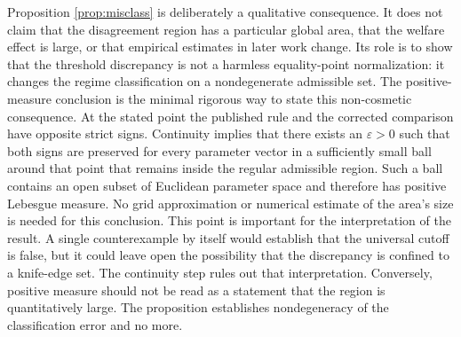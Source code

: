Proposition \ref{prop:misclass} is deliberately a qualitative consequence. It does not claim that the disagreement region has a particular global area, that the welfare effect is large, or that empirical estimates in later work change. Its role is to show that the threshold discrepancy is not a harmless equality-point normalization: it changes the regime classification on a nondegenerate admissible set. The positive-measure conclusion is the minimal rigorous way to state this non-cosmetic consequence. At the stated point the published rule and the corrected comparison have opposite strict signs. Continuity implies that there exists an $\varepsilon>0$ such that both signs are preserved for every parameter vector in a sufficiently small ball around that point that remains inside the regular admissible region. Such a ball contains an open subset of Euclidean parameter space and therefore has positive Lebesgue measure. No grid approximation or numerical estimate of the area's size is needed for this conclusion. This point is important for the interpretation of the result. A single counterexample by itself would establish that the universal cutoff is false, but it could leave open the possibility that the discrepancy is confined to a knife-edge set. The continuity step rules out that interpretation. Conversely, positive measure should not be read as a statement that the region is quantitatively large. The proposition establishes nondegeneracy of the classification error and no more.
